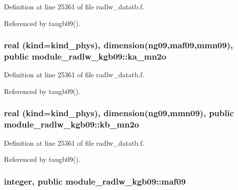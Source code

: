Definition at line 25361 of file radlw\+\_\+datatb.\+f.



Referenced by taugb09().

\subsubsection[{\texorpdfstring{ka\+\_\+mn2o}{ka_mn2o}}]{\setlength{\rightskip}{0pt plus 5cm}real (kind=kind\+\_\+phys), dimension(ng09,{\bf maf09},{\bf mmn09}), public module\+\_\+radlw\+\_\+kgb09\+::ka\+\_\+mn2o}\hypertarget{namespacemodule__radlw__kgb09_a37d98e8066c5995060a2a8451b45705f}{}\label{namespacemodule__radlw__kgb09_a37d98e8066c5995060a2a8451b45705f}


Definition at line 25361 of file radlw\+\_\+datatb.\+f.



Referenced by taugb09().

\subsubsection[{\texorpdfstring{kb\+\_\+mn2o}{kb_mn2o}}]{\setlength{\rightskip}{0pt plus 5cm}real (kind=kind\+\_\+phys), dimension(ng09,{\bf mmn09}), public module\+\_\+radlw\+\_\+kgb09\+::kb\+\_\+mn2o}\hypertarget{namespacemodule__radlw__kgb09_a79326139db789012d47c4750917c2cdb}{}\label{namespacemodule__radlw__kgb09_a79326139db789012d47c4750917c2cdb}


Definition at line 25361 of file radlw\+\_\+datatb.\+f.



Referenced by taugb09().

\subsubsection[{\texorpdfstring{maf09}{maf09}}]{\setlength{\rightskip}{0pt plus 5cm}integer, public module\+\_\+radlw\+\_\+kgb09\+::maf09}\hypertarget{namespacemodule__radlw__kgb09_a7d5d565c87af7ef07dc17930f9cb9e57}{}\label{namespacemodule__radlw__kgb09_a7d5d565c87af7ef07dc17930f9cb9e57}


